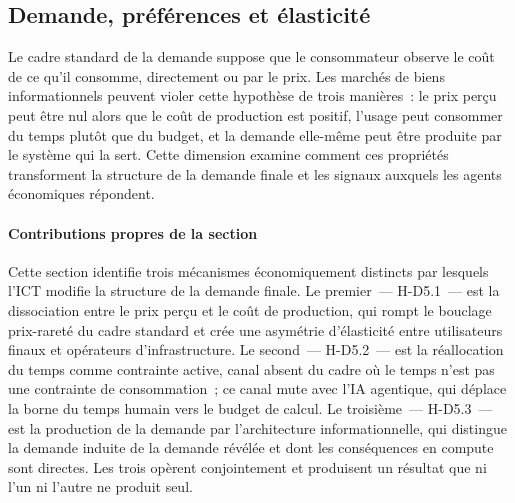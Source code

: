 

\subsection{Demande, préférences et élasticité}\label{sec:d5-demande}

Le cadre standard de la demande suppose que le consommateur observe le coût de ce qu'il consomme, directement ou par le prix. Les marchés de biens informationnels peuvent violer cette hypothèse de trois manières~: le prix perçu peut être nul alors que le coût de production est positif, l'usage peut consommer du temps plutôt que du budget, et la demande elle-même peut être produite par le système qui la sert. Cette dimension examine comment ces propriétés transforment la structure de la demande finale et les signaux auxquels les agents économiques répondent.

\paragraph{Contributions propres de la section}
Cette section identifie trois mécanismes économiquement distincts par lesquels l'ICT modifie la structure de la demande finale. Le premier~--- H-D5.1~--- est la dissociation entre le prix perçu et le coût de production, qui rompt le bouclage prix-rareté du cadre standard et crée une asymétrie d'élasticité entre utilisateurs finaux et opérateurs d'infrastructure. Le second~--- H-D5.2~--- est la réallocation du temps comme contrainte active, canal absent du cadre où le temps n'est pas une contrainte de consommation~; ce canal mute avec l'IA agentique, qui déplace la borne du temps humain vers le budget de calcul. Le troisième~--- H-D5.3~--- est la production de la demande par l'architecture informationnelle, qui distingue la demande induite de la demande révélée et dont les conséquences en compute sont directes. Les trois opèrent conjointement et produisent un résultat que ni l'un ni l'autre ne produit seul.


